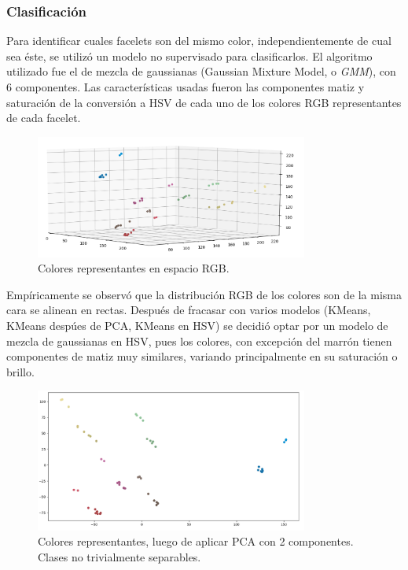\subsubsection{Clasificación}
Para identificar cuales facelets son del mismo color, independientemente de cual sea éste, se utilizó un modelo no supervisado para clasificarlos. El algoritmo utilizado fue el de mezcla de gaussianas (Gaussian Mixture Model, o \textit{GMM}), con 6 componentes. Las características usadas fueron las componentes matiz y saturación de la conversión a HSV de cada uno de los colores RGB representantes de cada facelet.

\begin{figure}[h!]
	\centering
	\includegraphics[width=0.8\textwidth]{figures/rgb_3d}
	\caption{Colores representantes en espacio RGB.}
	\label{rgb3d}
\end{figure}


Empíricamente se observó que la distribución RGB de los colores son de la misma cara se alinean en rectas. Después de fracasar con varios modelos (KMeans, KMeans despúes de PCA, KMeans en HSV) se decidió optar por un modelo de mezcla de gaussianas en HSV, pues los colores, con excepción del marrón tienen componentes de matiz muy similares, variando principalmente en su saturación o brillo.

\begin{figure}[h!]
	\centering
	\includegraphics[width=0.8\textwidth]{figures/rgb_pca}
	\caption{Colores representantes, luego de aplicar PCA con 2 componentes. Clases no trivialmente separables.}
	\label{rgb3d}
\end{figure}


